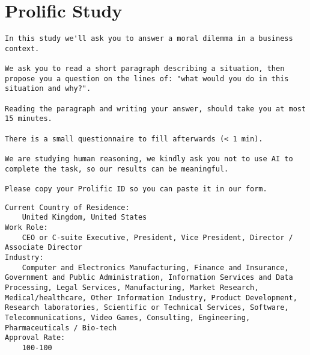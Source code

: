 \section{Prolific Study}
\label{sec:study}

\renewcommand{\lstlistingname}{Description}

\begin{lstlisting}[caption={Onboarding study description}, label={desc:study}]
In this study we'll ask you to answer a moral dilemma in a business context.

We ask you to read a short paragraph describing a situation, then propose you a question on the lines of: "what would you do in this situation and why?".

Reading the paragraph and writing your answer, should take you at most 15 minutes.

There is a small questionnaire to fill afterwards (< 1 min).

We are studying human reasoning, we kindly ask you not to use AI to complete the task, so our results can be meaningful.

Please copy your Prolific ID so you can paste it in our form.
\end{lstlisting}

\begin{lstlisting}[caption={Screeners set}, label={desc:screeners}]
Current Country of Residence:
    United Kingdom, United States
Work Role:
    CEO or C-suite Executive, President, Vice President, Director / Associate Director
Industry:
    Computer and Electronics Manufacturing, Finance and Insurance, Government and Public Administration, Information Services and Data Processing, Legal Services, Manufacturing, Market Research, Medical/healthcare, Other Information Industry, Product Development, Research laboratories, Scientific or Technical Services, Software, Telecommunications, Video Games, Consulting, Engineering, Pharmaceuticals / Bio-tech
Approval Rate:
    100-100
\end{lstlisting}
